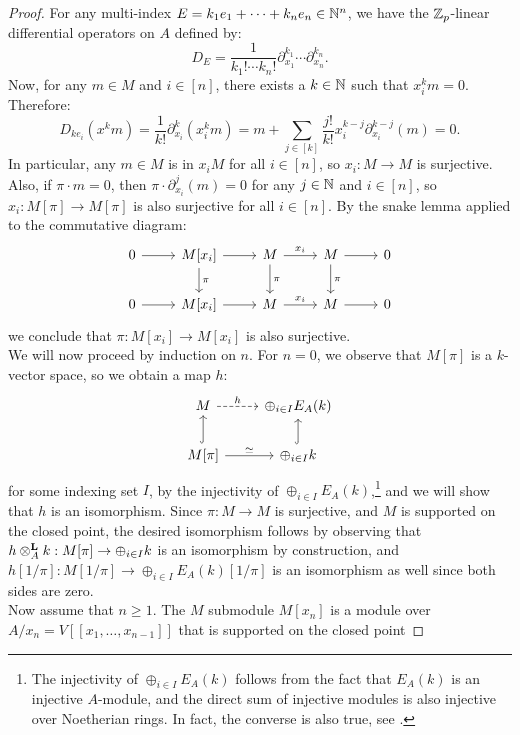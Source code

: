 \begin{proof}
For any multi-index $E=k_1e_1 + \cdots + k_ne_n \in \mathbb{N}^{n}$, we have the $\mathbb{Z}_p$-linear differential operators on $A$ defined by:
\[D_E=\frac{1}{k_1! \cdots k_n!} \partial_{x_1}^{k_1} \cdots \partial_{x_n}^{k_n}.\]
Now, for any $m \in M$ and $i \in [n]$, there exists a $k \in \mathbb{N}$ such that $x_i^km=0$. Therefore:
\[D_{k e_i}(x^km) = \frac{1}{k!} \partial_{x_i}^k(x_i^km) = m + \sum_{j \in [k]} \frac{j!}{k!} x_i^{k-j} \partial_{x_i}^{k-j}(m) = 0.\]
In particular, any $m \in M$ is in $x_iM$ for all $i \in [n]$, so $x_i: M \to M$ is surjective. Also, if $\pi \cdot m = 0$, then $\pi \cdot \partial^{j}_{x_i}(m) = 0$ for any $j \in \mathbb{N}$ and $i \in [n]$, 
so $x_i: M[\pi] \to M[\pi]$ is also surjective for all $i \in [n]$. By the snake lemma applied to the commutative diagram:
\[\begin{tikzcd}
0 \arrow[r] & M[x_i] \arrow[r] \arrow[d, "\pi"] & M \arrow[r, "x_i"] \arrow[d, "\pi"] & M \arrow[r] \arrow[d, "\pi"] & 0\\
0 \arrow[r] & M[x_i] \arrow[r] & M \arrow[r, "x_i"] & M \arrow[r] & 0\end{tikzcd}\]
we conclude that $\pi: M[x_i]\to M[x_i]$ is also surjective.\\
\indent We will now proceed by induction on $n$. For $n=0$, we observe that $M[\pi]$ is a $k$-vector space, so we obtain a map $h$:
\[\begin{tikzcd}
M \arrow[r, dashed, "h"] & \oplus_{i\in I} E_A(k) \\
M[\pi] \arrow[r, "\simeq"] \arrow[u, hook] & \oplus_{i \in I} k \arrow[u, hook]
\end{tikzcd}\]
for some indexing set $I$, by the injectivity of $\oplus_{i \in I} E_A(k)$,\footnote{The injectivity of $\oplus_{i \in I} E_A(k)$ follows from the fact that $E_A(k)$ is an injective $A$-module, and the direct sum of injective modules is also injective over Noetherian rings. 
In fact, the converse is also true, see \cite[Theorem 3.46]{Lam}.} 
and we will show that $h$ is an isomorphism. Since $\pi: M \to M$ is surjective, and $M$ is supported on the closed point, the desired isomorphism follows
by observing that $h \otimes^{\boldsymbol{\mathrm{L}}}_A k: M[\pi] \rightarrow \oplus_{i \in I} k$ is an isomorphism by construction, and $h[1/\pi] : M[1/\pi] \to \oplus_{i \in I} E_A(k)[1/\pi]$ is an isomorphism as well since both sides are zero.\\
\indent Now assume that $n \ge 1$. The $M$ submodule $M[x_n]$ is a module over $A/x_n=V[[x_1, \ldots, x_{n-1}]]$ that is supported on the closed point 

\end{proof}
